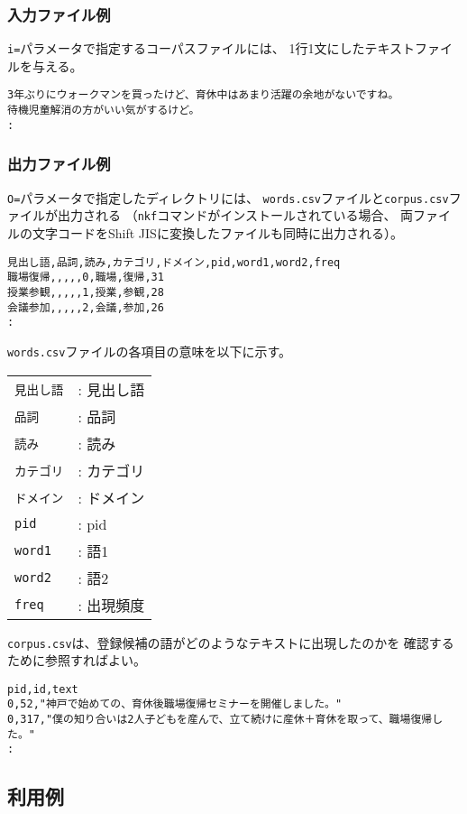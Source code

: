 \subsubsection*{入力ファイル例}

\verb|i=|パラメータで指定するコーパスファイルには、
1行1文にしたテキストファイルを与える。

\begin{Verbatim}[baselinestretch=0.7,frame=single]
3年ぶりにウォークマンを買ったけど、育休中はあまり活躍の余地がないですね。
待機児童解消の方がいい気がするけど。
:
\end{Verbatim}

\subsubsection*{出力ファイル例}

\verb|O=|パラメータで指定したディレクトリには、
\verb|words.csv|ファイルと\verb|corpus.csv|ファイルが出力される
（\verb|nkf|コマンドがインストールされている場合、
両ファイルの文字コードをShift JISに変換したファイルも同時に出力される）。

\begin{Verbatim}[baselinestretch=0.7,frame=single]
見出し語,品詞,読み,カテゴリ,ドメイン,pid,word1,word2,freq
職場復帰,,,,,0,職場,復帰,31
授業参観,,,,,1,授業,参観,28
会議参加,,,,,2,会議,参加,26
:
\end{Verbatim}

\newpage

\verb|words.csv|ファイルの各項目の意味を以下に示す。

\begin{table}[htbp]
{\small
\begin{tabular}{ll}
\verb|見出し語| & : 見出し語 \\  
\verb|品詞|     & : 品詞 \\  
\verb|読み|     & : 読み \\  
\verb|カテゴリ| & : カテゴリ \\  
\verb|ドメイン| & : ドメイン \\  
\verb|pid|      & : pid \\  
\verb|word1|    & : 語1 \\  
\verb|word2|    & : 語2 \\  
\verb|freq|     & : 出現頻度 \\  
\end{tabular} 
}
\end{table} 

\verb|corpus.csv|は、登録候補の語がどのようなテキストに出現したのかを
確認するために参照すればよい。

\begin{Verbatim}[baselinestretch=0.7,frame=single]
pid,id,text
0,52,"神戸で始めての、育休後職場復帰セミナーを開催しました。"
0,317,"僕の知り合いは2人子どもを産んで、立て続けに産休＋育休を取って、職場復帰した。"
:
\end{Verbatim}




\subsection{利用例}


%


